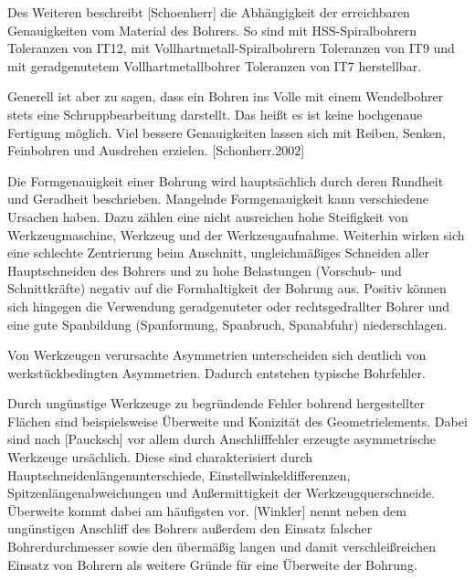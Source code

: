 Des Weiteren beschreibt [Schoenherr] die Abhängigkeit der erreichbaren Genauigkeiten vom Material des Bohrers. So sind mit HSS-Spiralbohrern Toleranzen von IT12, mit Vollhartmetall-Spiralbohrern Toleranzen von IT9 und mit geradgenutetem Vollhartmetallbohrer Toleranzen von IT7 herstellbar. 

Generell ist aber zu sagen, dass ein Bohren ins Volle mit einem Wendelbohrer stets eine Schruppbearbeitung darstellt. Das heißt es ist keine hochgenaue Fertigung möglich. Viel bessere Genauigkeiten lassen sich mit Reiben, Senken, Feinbohren und Ausdrehen erzielen. [Schonherr.2002]

Die Formgenauigkeit einer Bohrung wird hauptsächlich durch deren Rundheit und Geradheit beschrieben. Mangelnde Formgenauigkeit kann verschiedene Ursachen haben. Dazu zählen eine nicht ausreichen hohe Steifigkeit von Werkzeugmaschine, Werkzeug und der Werkzeugaufnahme. Weiterhin wirken sich eine schlechte Zentrierung beim Anschnitt, ungleichmäßiges Schneiden aller Hauptschneiden des Bohrers und zu hohe Belastungen (Vorschub- und Schnittkräfte) negativ auf die Formhaltigkeit der Bohrung aus. Positiv können sich hingegen die Verwendung geradgenuteter oder rechtsgedrallter Bohrer und eine gute Spanbildung (Spanformung, Spanbruch, Spanabfuhr) niederschlagen. 

Von Werkzeugen verursachte Asymmetrien unterscheiden sich deutlich von werkstückbedingten Asymmetrien. Dadurch entstehen typische Bohrfehler.

Durch ungünstige Werkzeuge zu begründende Fehler bohrend hergestellter Flächen sind beispielsweise Überweite und Konizität des Geometrielements. Dabei sind nach [Paucksch] vor allem durch Anschlifffehler erzeugte asymmetrische Werkzeuge ursächlich. Diese sind charakterisiert durch Hauptschneidenlängenunterschiede, Einstellwinkeldifferenzen, Spitzenlängenabweichungen und Außermittigkeit der Werkzeugquerschneide.
Überweite kommt dabei am häufigsten vor. [Winkler] nennt neben dem ungünstigen Anschliff des Bohrers außerdem den Einsatz falscher Bohrerdurchmesser sowie den übermäßig langen und damit verschleißreichen Einsatz von Bohrern als weitere Gründe für eine Überweite der Bohrung.    



 

      





 

   
     



      







